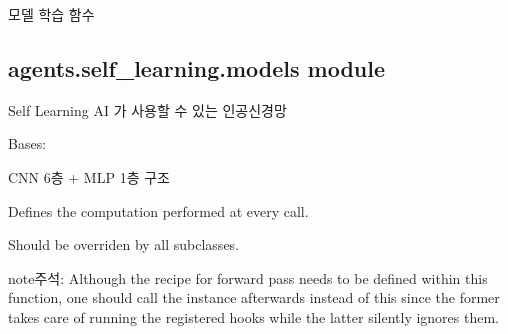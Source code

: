 \documentclass[letterpaper,10pt,english]{sphinxmanual}
\begin{document}

\begin{fulllineitems}
\label{\detokenize{agents.self_learning:agents.self_learning.agent.train}}
모델 학습 함수

\end{fulllineitems}



\subsection{agents.self\_learning.models module}
\label{\detokenize{agents.self_learning:agents-self-learning-models-module}}\label{\detokenize{agents.self_learning:module-agents.self_learning.models}}
Self Learning AI 가 사용할 수 있는 인공신경망

\begin{fulllineitems}
\label{\detokenize{agents.self_learning:agents.self_learning.models.C64r6L1024r}}
Bases: 

CNN 6층 + MLP 1층 구조

\begin{fulllineitems}
\label{\detokenize{agents.self_learning:agents.self_learning.models.C64r6L1024r.forward}}
Defines the computation performed at every call.

Should be overriden by all subclasses.

\begin{sphinxadmonition}{note}{주석:}
Although the recipe for forward pass needs to be defined within
this function, one should call the  instance afterwards
instead of this since the former takes care of running the
registered hooks while the latter silently ignores them.
\end{sphinxadmonition}

\end{fulllineitems}


\end{fulllineitems}
\end{document}
